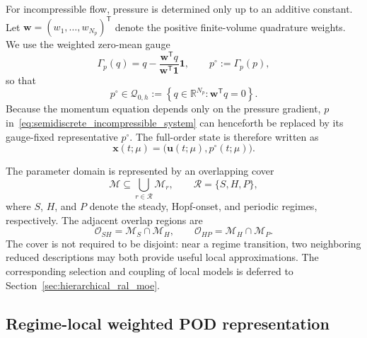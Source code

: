 For incompressible flow, pressure is determined only up to an additive
constant.  Let $\boldsymbol{w}=(w_1,\ldots,w_{N_p})^{\mathsf T}$ denote the
positive finite-volume quadrature weights.  We use the weighted zero-mean
gauge
\begin{equation}
  \Gamma_p(q)
  =
  q-
  \frac{\boldsymbol{w}^{\mathsf T}q}
       {\boldsymbol{w}^{\mathsf T}\boldsymbol{1}}
  \boldsymbol{1},
  \qquad
  p^{\circ}:=\Gamma_p(p),
  \label{eq:pressure_gauge}
\end{equation}
so that
\begin{equation}
  p^{\circ}\in\mathcal{Q}_{0,h}
  :=
  \left\{
    q\in\mathbb{R}^{N_p}:\boldsymbol{w}^{\mathsf T}q=0
  \right\}.
  \label{eq:discrete_zero_mean_pressure_space}
\end{equation}
Because the momentum equation depends only on the pressure gradient,
$p$ in~\eqref{eq:semidiscrete_incompressible_system} can henceforth be
replaced by its gauge-fixed representative $p^{\circ}$.  The full-order state
is therefore written as
\begin{equation}
  \boldsymbol{x}(t;\mu)
  =
  \bigl(\boldsymbol{u}(t;\mu),p^{\circ}(t;\mu)\bigr).
  \label{eq:full_state_definition}
\end{equation}

The parameter domain is represented by an overlapping cover
\begin{equation}
  \mathcal{M}
  \subseteq
  \bigcup_{r\in\mathcal{R}}\mathcal{M}_r,
  \qquad
  \mathcal{R}=\{S,H,P\},
  \label{eq:regime_cover}
\end{equation}
where $S$, $H$, and $P$ denote the steady, Hopf-onset, and periodic regimes,
respectively.  The adjacent overlap regions are
\begin{equation}
  \mathcal{O}_{SH}=\mathcal{M}_{S}\cap\mathcal{M}_{H},
  \qquad
  \mathcal{O}_{HP}=\mathcal{M}_{H}\cap\mathcal{M}_{P}.
  \label{eq:adjacent_overlaps}
\end{equation}
The cover is not required to be disjoint: near a regime transition, two
neighboring reduced descriptions may both provide useful local
approximations.  The corresponding selection and coupling of local models is
deferred to Section~\ref{sec:hierarchical_ral_moe}.

\subsection{Regime-local weighted POD representation}
\label{subsec:local_pod_and_gauge}

